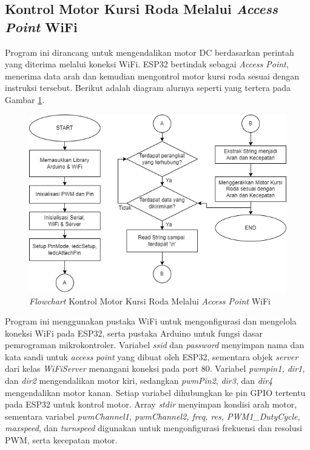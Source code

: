 \subsection{Kontrol Motor Kursi Roda Melalui \emph{Access Point} WiFi}

Program ini dirancang untuk mengendalikan motor DC berdasarkan perintah yang diterima melalui koneksi WiFi. ESP32 bertindak sebagai \emph{Access Point}, menerima data arah dan kemudian mengontrol motor kursi roda sesuai dengan instruksi tersebut. Berikut adalah diagram alurnya seperti yang tertera pada Gambar \ref{fig:Flowchart 8 Kontrol WiFi}.

\begin{figure}[H]
\centering
\includegraphics[scale=0.5]{gambar/bab3/8. Kontrol Motor WiFi.png}
\caption{\emph{Flowchart} Kontrol Motor Kursi Roda Melalui \emph{Access Point} WiFi}
\label{fig:Flowchart 8 Kontrol WiFi}
\end{figure}

Program ini menggunakan pustaka WiFi untuk mengonfigurasi dan mengelola koneksi WiFi pada ESP32, serta pustaka Arduino untuk fungsi dasar pemrograman mikrokontroler. Variabel \emph{ssid} dan \emph{password} menyimpan nama dan kata sandi untuk \emph{access point} yang dibuat oleh ESP32, sementara objek \emph{server} dari kelas \emph{WiFiServer} menangani koneksi pada port 80. Variabel \emph{pwmpin1, dir1,} dan \emph{dir2} mengendalikan motor kiri, sedangkan \emph{pwmPin2}, \emph{dir3}, dan \emph{dir4} mengendalikan motor kanan. Setiap variabel dihubungkan ke pin GPIO tertentu pada ESP32 untuk kontrol motor. Array \emph{stdir} menyimpan kondisi arah motor, sementara variabel \emph{pwmChannel1, pwmChannel2, freq, res, PWM1\_DutyCycle, maxspeed}, dan \emph{turnspeed} digunakan untuk mengonfigurasi frekuensi dan resolusi PWM, serta kecepatan motor.

